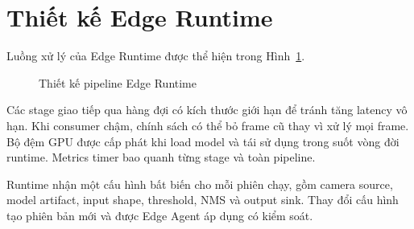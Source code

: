 \section{Thiết kế Edge Runtime}

Luồng xử lý của Edge Runtime được thể hiện trong
Hình~\ref{fig:edge-runtime-design}.

\begin{figure}[H]
\centering
{}
\caption{Thiết kế pipeline Edge Runtime}
\label{fig:edge-runtime-design}
\end{figure}

Các stage giao tiếp qua hàng đợi có kích thước giới hạn để tránh tăng latency vô
hạn. Khi consumer chậm, chính sách có thể bỏ frame cũ thay vì xử lý mọi frame.
Bộ đệm GPU được cấp phát khi load model và tái sử dụng trong suốt vòng đời
runtime. Metrics timer bao quanh từng stage và toàn pipeline.

Runtime nhận một cấu hình bất biến cho mỗi phiên chạy, gồm camera source, model
artifact, input shape, threshold, NMS và output sink. Thay đổi cấu hình tạo phiên
bản mới và được Edge Agent áp dụng có kiểm soát.